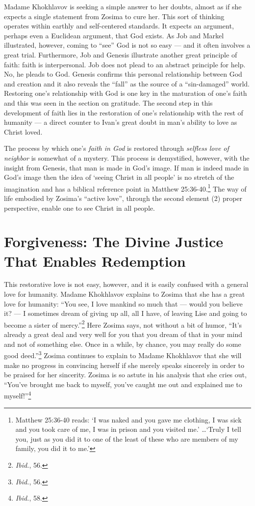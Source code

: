 Madame Khokhlavov is seeking a simple answer to her doubts, almost as if she expects a single statement from Zosima to cure her. This sort of thinking operates within earthly and self-centered standards. It expects an argument, perhaps even a Euclidean argument, that God exists. As Job and Markel illustrated, however, coming to ``see'' God is not so easy --- and it often involves a great trial. Furthermore, Job and Genesis illustrate another great principle of faith: faith is interpersonal. Job does not plead to an abstract principle for help. No, he pleads to God. Genesis confirms this personal relationship between God and creation and it also reveals the ``fall'' as the source of a ``sin-damaged'' world. Restoring one's relationship with God is one key in the maturation of one's faith and this was seen in the section on gratitude. The second step in this development of faith lies in the restoration of one's relationship with the rest of humanity --- a direct counter to Ivan's great doubt in man's ability to love as Christ loved. 

The process by which one's \emph{faith in God} is restored through \emph{selfless love of neighbor} is somewhat of a mystery. This process is demystified, however, with the insight from Genesis, that man is made in God's image. If man is indeed made in God's image then the idea of `seeing Christ in all people' is no stretch of the imagination and has a biblical reference point in Matthew 25:36-40.\footnote{Matthew 25:36-40 reads: `I was naked and you gave me clothing, I was sick and you took care of me, I was in prison and you visited me.' \ldots `Truly I tell you, just as you did it to one of the least of these who are members of my family, you did it to me.'} The way of life embodied by Zosima's ``active love'', through the second element (2) proper perspective, enable one to see Christ in all people.

\section{Forgiveness: The Divine Justice That Enables Redemption}
This restorative love is not easy, however, and it is easily confused with a general love for humanity. Madame Khokhlavov explains to Zosima that she has a great love for humanity: ``You see, I love mankind so much that --- would you believe it? --- I sometimes dream of giving up all, all I have, of leaving Lise and going to become a sister of mercy.''\footnote{\emph{Ibid.}, 56.} Here Zosima says, not without a bit of humor, ``It's already a great deal and very well for you that you dream of that in your mind and not of something else. Once in a while, by chance, you may really do some good deed.''\footnote{\emph{Ibid.}, 56.} Zosima continues to explain to Madame Khokhlavov that she will make no progress in convincing herself if she merely speaks sincerely in order to be praised for her sincerity. Zosima is so astute in his analysis that she cries out, ``You've brought me back to myself, you've caught me out and explained me to myself!''\footnote{\emph{Ibid.}, 58.}

